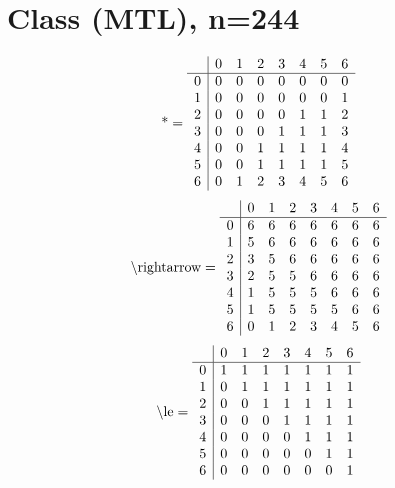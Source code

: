 \documentclass[11pt]{article}
\begin{document}
\section{Class (MTL), n=244}
\[\text{*} = 
\begin{array}{r | r r r r r r r}
 & 0 & 1 & 2 & 3 & 4 & 5 & 6 \\ \hline
0 & 0 & 0 & 0 & 0 & 0 & 0 & 0 \\
1 & 0 & 0 & 0 & 0 & 0 & 0 & 1 \\
2 & 0 & 0 & 0 & 0 & 1 & 1 & 2 \\
3 & 0 & 0 & 0 & 1 & 1 & 1 & 3 \\
4 & 0 & 0 & 1 & 1 & 1 & 1 & 4 \\
5 & 0 & 0 & 1 & 1 & 1 & 1 & 5 \\
6 & 0 & 1 & 2 & 3 & 4 & 5 & 6 \\
\end{array}
\]
\[\text{\textbackslash rightarrow} = 
\begin{array}{r | r r r r r r r}
 & 0 & 1 & 2 & 3 & 4 & 5 & 6 \\ \hline
0 & 6 & 6 & 6 & 6 & 6 & 6 & 6 \\
1 & 5 & 6 & 6 & 6 & 6 & 6 & 6 \\
2 & 3 & 5 & 6 & 6 & 6 & 6 & 6 \\
3 & 2 & 5 & 5 & 6 & 6 & 6 & 6 \\
4 & 1 & 5 & 5 & 5 & 6 & 6 & 6 \\
5 & 1 & 5 & 5 & 5 & 5 & 6 & 6 \\
6 & 0 & 1 & 2 & 3 & 4 & 5 & 6 \\
\end{array}
\]
\[\text{\textbackslash le} = 
\begin{array}{r | r r r r r r r}
 & 0 & 1 & 2 & 3 & 4 & 5 & 6 \\ \hline
0 & 1 & 1 & 1 & 1 & 1 & 1 & 1 \\
1 & 0 & 1 & 1 & 1 & 1 & 1 & 1 \\
2 & 0 & 0 & 1 & 1 & 1 & 1 & 1 \\
3 & 0 & 0 & 0 & 1 & 1 & 1 & 1 \\
4 & 0 & 0 & 0 & 0 & 1 & 1 & 1 \\
5 & 0 & 0 & 0 & 0 & 0 & 1 & 1 \\
6 & 0 & 0 & 0 & 0 & 0 & 0 & 1 \\
\end{array}
\]
\end{document}
